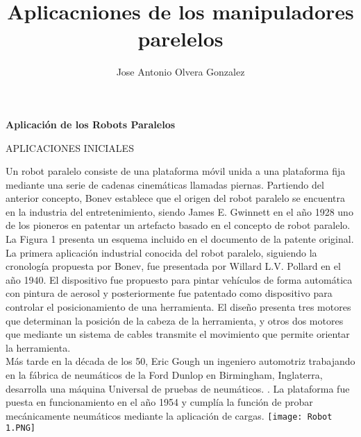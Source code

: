 \documentclass[12pt,letterpaper]{report}
\author{Jose Antonio Olvera Gonzalez }
\title{Aplicacniones de los manipuladores parelelos }
\begin{document}
\begin{center}
\textbf{Aplicación de los Robots Paralelos }
\end{center}
APLICACIONES INICIALES 
\begin{flushleft}
Un robot paralelo consiste de una plataforma móvil unida a una plataforma fija mediante una serie de cadenas cinemáticas llamadas piernas. Partiendo del anterior concepto, Bonev establece que el origen del robot paralelo se encuentra en la industria del entretenimiento, siendo James E. Gwinnett en el año 1928 uno de los pioneros en patentar un artefacto basado en el concepto de robot paralelo. La Figura 1 presenta un esquema incluido en el documento de la patente original.\\
La primera aplicación industrial conocida del robot paralelo, siguiendo la cronología propuesta por Bonev, fue  presentada por Willard L.V. Pollard en el año 1940. El dispositivo fue propuesto para pintar vehículos de forma automática con  pintura de aerosol y posteriormente fue patentado como dispositivo para controlar el posicionamiento de una herramienta. El diseño presenta tres motores que determinan la posición de la cabeza de la herramienta, y otros dos motores que mediante un sistema de cables transmite el movimiento que permite orientar la herramienta. \\
Más tarde en la década de los 50, Eric Gough un ingeniero automotriz trabajando en la fábrica de neumáticos de la Ford Dunlop en Birmingham, Inglaterra, desarrolla una máquina Universal de pruebas de neumáticos. . La plataforma fue puesta en funcionamiento en el año 1954 y cumplía la función de probar mecánicamente neumáticos mediante la aplicación de cargas. 
\texttt{[image: Robot 1.PNG]} \\


\end{flushleft}
\end{document}
